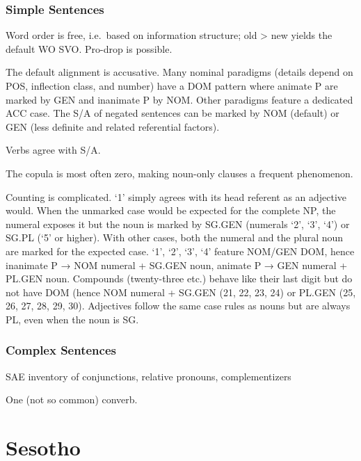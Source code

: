 \documentclass[a4paper, 11pt]{book}
\begin{document}
\subsubsection*{Simple Sentences}

\begin{itemize*}
\item Word order is free, i.e.\ based on information structure; old > new yields the default WO SVO. Pro-drop is possible. 
\item The default alignment is accusative. Many nominal paradigms (details depend on POS, inflection class, and number) have a DOM pattern where animate P are marked by GEN and inanimate P by NOM. Other paradigms feature a dedicated ACC case. The S/A of negated sentences can be marked by NOM (default) or GEN (less definite and related referential factors).
\item Verbs agree with S/A. 
\item The copula is most often zero, making noun-only clauses a frequent phenomenon. 
\item Counting is complicated. ‘1’ simply agrees with its head referent as an adjective would. When the unmarked case would be expected for the complete NP, the numeral exposes it but the noun is marked by SG.GEN (numerals ‘2’, ‘3’, ‘4’) or SG.PL (‘5’ or higher). With other cases, both the numeral and the plural noun are marked for the expected case. ‘1’, ‘2’, ‘3’, ‘4’ feature NOM/GEN DOM, hence inanimate P → NOM numeral + SG.GEN noun, animate P → GEN numeral + PL.GEN noun. Compounds (twenty-three etc.) behave like their last digit but do not have DOM (hence NOM numeral + SG.GEN (21, 22, 23, 24) or PL.GEN (25, 26, 27, 28, 29, 30). Adjectives follow the same case rules as nouns but are always PL, even when the noun is SG.
 \end{itemize*}

\subsubsection*{Complex Sentences}

\begin{itemize*}
\item SAE inventory of conjunctions, relative pronouns, complementizers
\item One (not so common) converb.
\end{itemize*}


\section{Sesotho}
\label{sec:Sesotho}
\end{document}

